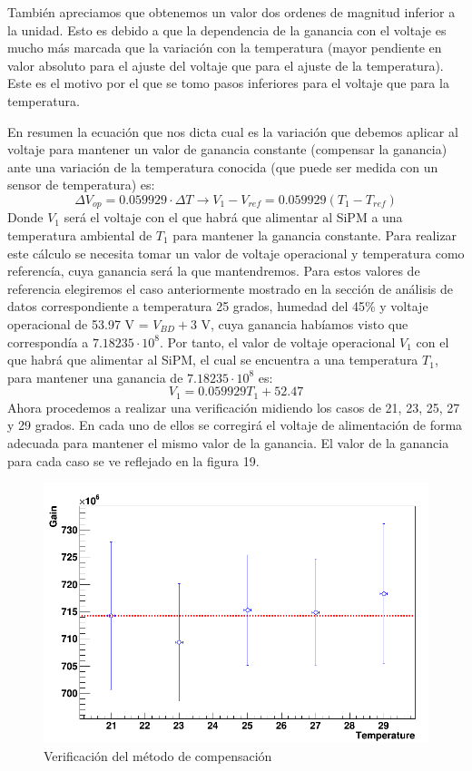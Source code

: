También apreciamos que obtenemos un valor dos ordenes de magnitud inferior a la unidad. Esto es debido a que la dependencia de la ganancia con el voltaje es mucho más marcada que la variación con la temperatura (mayor pendiente en valor absoluto para el ajuste del voltaje que para el ajuste de la temperatura). Este es el motivo por el que se tomo pasos inferiores para el voltaje que para la temperatura. 

En resumen la ecuación que nos dicta cual es la variación que debemos aplicar al voltaje para mantener un valor de ganancia constante (compensar la ganancia) ante una variación de la temperatura conocida (que puede ser medida con un sensor de temperatura) es:
\begin{equation}
\Delta V_{op}=0.059929 \cdot \Delta T \longrightarrow V_1-V_{ref}=0.059929(T_1-T_{ref})
\label{compensacionfinal}
\end{equation}
Donde $V_1$ será el voltaje con el que habrá que alimentar al SiPM a una temperatura ambiental de $T_1$ para mantener la ganancia constante. Para realizar este cálculo se necesita tomar un valor de voltaje operacional y temperatura como referencía, cuya ganancia será la que mantendremos. Para estos valores de referencia elegiremos el caso anteriormente mostrado en la sección de análisis de datos correspondiente a temperatura 25 grados, humedad del 45\% y voltaje operacional de 53.97 V = $V_{BD}+ 3$ V, cuya ganancia habíamos visto que correspondía a $7.18235 \cdot 10^8$. Por tanto, el valor de voltaje operacional $V_1$ con el que habrá que alimentar al SiPM, el cual se encuentra a una temperatura $T_1$, para mantener una ganancia de $7.18235 \cdot 10^8$ es:
\begin{equation}
V_1=0.059929T_1+52.47
\label{compensacionfinal}
\end{equation}
Ahora procedemos a realizar una verificación midiendo los casos de 21, 23, 25, 27 y 29 grados. En cada uno de ellos se corregirá el voltaje de alimentación de forma adecuada para mantener el mismo valor de la ganancia. El valor de la ganancia para cada caso se ve reflejado en la figura 19. 

\begin{figure}[hbtp]
\centering
\includegraphics[scale=0.4]{compensacion.png}
\caption{Verificación del método de compensación\label{compensacion}}
\end{figure}

